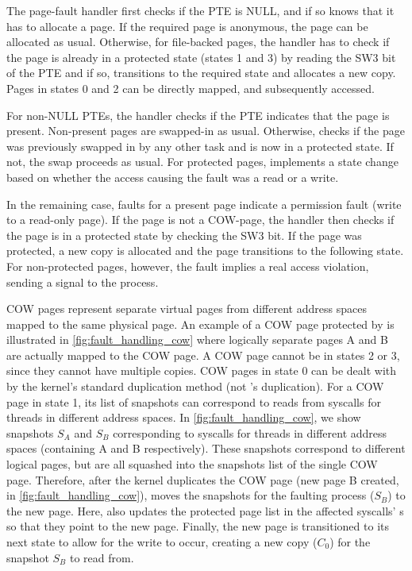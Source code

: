 \documentclass[letterpaper,twocolumn,10pt, anonymous]{article}
\begin{document}
The page-fault handler first checks if the PTE is NULL, and if so 
knows that it has to allocate a page. 
If the required page is anonymous, the page can be allocated as usual.
Otherwise, for file-backed pages, the handler has to check if the 
page is already in a protected state (states 1 and 3) by reading 
the SW3 bit of the PTE and if so, transitions to the required state
and allocates a new copy. 
Pages in states 0 and 2 can be directly mapped, and subsequently
accessed.

For non-NULL PTEs, the handler checks if the PTE indicates that the 
page is present.
Non-present pages are swapped-in as usual.
Otherwise, \tiktok checks if the page was previously swapped in by 
any other task and is now in a protected state.
If not, the swap proceeds as usual.
For protected pages, \tiktok implements a state change based on 
whether the access causing the fault was a read or a write.

In the remaining case, faults for a present page indicate a 
permission fault (write to a read-only page).
If the page is not a COW-page, the handler then checks if the page
is in a protected state by checking the SW3 bit.
If the page was protected, a new copy is allocated and the page 
transitions to the following state.
For non-protected pages, however, the fault implies a real access
violation, sending a signal to the process.

COW pages represent separate virtual pages from different 
address spaces mapped to the same physical page.
An example of a COW page protected by \tiktok is illustrated in 
\autoref{fig:fault_handling_cow} where logically separate pages A and B 
are actually mapped to the COW page.
A COW page cannot be in states 2 or 3, since they cannot have multiple
\tiktok copies.
COW pages in state 0 can be dealt with by the kernel's standard
duplication method (not \tiktok's duplication).
For a COW page in state 1, its list of snapshots can correspond to 
reads from syscalls for threads in different address spaces.
In \autoref{fig:fault_handling_cow}, we show snapshots $S_A$ and 
$S_B$ corresponding to syscalls for threads in different address 
spaces (containing A and B respectively).
These snapshots correspond to different logical pages, but are 
all squashed into the snapshots list of the single COW page. 
Therefore, after the kernel duplicates the COW page (new page
B created, in \autoref{fig:fault_handling_cow}), \tiktok moves 
the snapshots for the faulting process ($S_B$) to the new page.
Here, \tiktok also updates the protected page list in the 
affected syscalls' s so that they point to the 
new page.
Finally, the new page is transitioned to its next state to allow 
for the write to occur, creating a new copy ($C_0$) for the
snapshot $S_B$ to read from.
\end{document}
